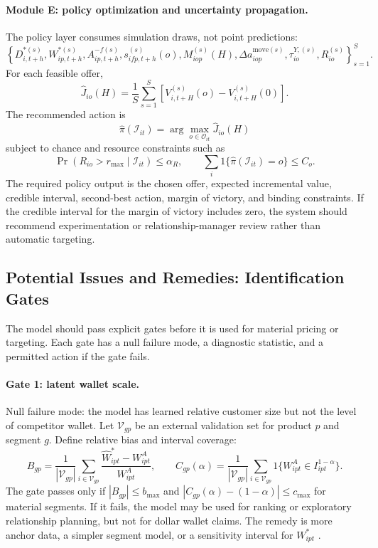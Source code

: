 \documentclass[11pt]{article}
\begin{document}
\paragraph{Module E: policy optimization and uncertainty propagation.}
The policy layer consumes simulation draws, not point predictions:
\[
  \left\{
  D_{i,t+h}^{*(s)}, W_{ip,t+h}^{*(s)},
  A_{ip,t+h}^{-f(s)}, s_{ifp,t+h}^{(s)}(o),
  M_{iop}^{(s)}(H), \Delta a_{iop}^{\mathrm{move}(s)},
  \tau_{io}^{Y,(s)}, R_{io}^{(s)}
  \right\}_{s=1}^{S}.
\]
For each feasible offer,
\[
  \widehat{J}_{io}(H)
  =
  \frac{1}{S}\sum_{s=1}^{S}
  \left[
    V_{i,t+H}^{(s)}(o)-V_{i,t+H}^{(s)}(0)
  \right].
\]
The recommended action is
\[
  \widehat{\pi}(\mathcal{I}_{it})
  =
  \arg\max_{o\in\mathcal{O}_{it}}\widehat{J}_{io}(H)
\]
subject to chance and resource constraints such as
\[
  \Pr(R_{io}>r_{\max}\mid\mathcal{I}_{it})\le\alpha_R,\qquad
  \sum_i 1\{\widehat{\pi}(\mathcal{I}_{it})=o\}\le C_o.
\]
The required policy output is the chosen offer, expected incremental value,
credible interval, second-best action, margin of victory, and binding
constraints. If the credible interval for the margin of victory includes zero,
the system should recommend experimentation or relationship-manager review
rather than automatic targeting.

\subsection{Potential Issues and Remedies: Identification Gates}

The model should pass explicit gates before it is used for material pricing or
targeting. Each gate has a null failure mode, a diagnostic statistic, and a
permitted action if the gate fails.

\paragraph{Gate 1: latent wallet scale.}
Null failure mode: the model has learned relative customer size but not the
level of competitor wallet. Let $\mathcal{V}_{gp}$ be an external validation
set for product $p$ and segment $g$. Define relative bias and interval coverage:
\[
  B_{gp}
  =
  \frac{1}{|\mathcal{V}_{gp}|}
  \sum_{i\in\mathcal{V}_{gp}}
  \frac{\widehat{W}_{ipt}^{*}-W_{ipt}^{A}}{W_{ipt}^{A}},
  \qquad
  C_{gp}(\alpha)
  =
  \frac{1}{|\mathcal{V}_{gp}|}
  \sum_{i\in\mathcal{V}_{gp}}
  1\{W_{ipt}^{A}\in I_{ipt}^{1-\alpha}\}.
\]
The gate passes only if $|B_{gp}|\le b_{\max}$ and
$|C_{gp}(\alpha)-(1-\alpha)|\le c_{\max}$ for material segments. If it fails,
the model may be used for ranking or exploratory relationship planning, but not
for dollar wallet claims. The remedy is more anchor data, a simpler segment
model, or a sensitivity interval for $W_{ipt}^{*}$
\citep{kamakura1991latent,dempster1977em}.
\end{document}
